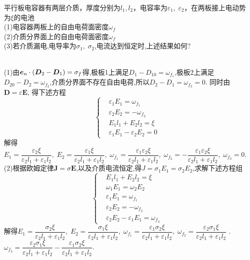 \documentclass{mynote}
\begin{document}
\begin{exercise}{1.11}
    平行板电容器有两层介质，厚度分别为$l_1, l_2$，电容率为$\varepsilon_1,\; \varepsilon_2$，在两板接上电动势为$\xi$的电池 \\
    (1)电容器两板上的自由电荷面密度$\omega_f$\\
    (2)介质分界面上的自由电荷面密度$\omega_f$ \\
    (3)若介质漏电,电导率为$\sigma_1,\; \sigma_2$,电流达到恒定时,上述结果如何?
\end{exercise}
\begin{solution}
    \quad \\
    (1)由$\boldsymbol{e}_n \cdot (\boldsymbol{D}_2 - \boldsymbol{D}_1) = \sigma_f$得,极板1上满足$D_1 - D_{10} = \omega_{f_1}$,极板2上满足$D_{20} - D_2 = \omega_{f_2}$,介质分界面不存在自由电荷,所以$D_2 - D_1 = \omega_{f_3} = 0$. 同时由$\bm{D} = \varepsilon \bm{E}$, 得下述方程
    \[
    \left\{
        \begin{aligned}
            & \varepsilon_1 E_1 = \omega_{f_1} \\
            & \varepsilon_2 E_2 = -\omega_{f_2} \\
            & E_1 l_1 + E_2 l_2 = \xi \\
            &  \varepsilon_1 E_1 - \varepsilon_2 E_2 = 0
        \end{aligned}
    \right.    
    \]
    解得$E_1 = \dfrac{\varepsilon_2 \xi}{\varepsilon_2l_1 + \varepsilon_1l_2}, \; E_2 = \dfrac{\varepsilon_1 \xi}{\varepsilon_2l_1 + \varepsilon_1l_2},\; \omega_{f_1} = \dfrac{\varepsilon_1 \varepsilon_2 \xi}{\varepsilon_2l_1 + \varepsilon_1l_2},\; \omega_{f_2} = -\dfrac{\varepsilon_1 \varepsilon_2 \xi}{\varepsilon_2l_1 + \varepsilon_1l_2},\; \omega_{f_3} = 0$.\\
    (2)根据欧姆定律$\bm{J} = \sigma \bm{E}$,以及介质电流恒定,得$J = \sigma_1 E_1 = \sigma_2 E_2$,求解下述方程组
    \[
    \left\{
        \begin{aligned}
            & E_1 l_1 + E_2 l_2 = \xi \\
            &  \omega_1 E_1 = \omega_2 E_2\\ 
            & \varepsilon_1 E_1 = \omega_{f_1} \\
            & \varepsilon_2 E_2 = -\omega_{f_2} \\
            &  \varepsilon_2 E_2 -  \varepsilon_1 E_1 = \omega_{f_3}
        \end{aligned}
    \right.    
    \]
    解得$E_1 = \dfrac{\sigma_2 \xi}{\varepsilon_2l_1 + \varepsilon_1l_2},\; E_2 = \dfrac{\sigma_1 \xi}{\varepsilon_2l_1 + \varepsilon_1l_2},\; \omega_{f_1} = \dfrac{\varepsilon_1 \sigma_2 \xi}{\varepsilon_2l_1 + \varepsilon_1l_2},\; \omega_{f_2} = \dfrac{\varepsilon_2 \sigma_1 \xi}{\varepsilon_2l_1 + \varepsilon_1l_2}$ .\\
    $\omega_{f_3} = \dfrac{\varepsilon_2 \sigma_1 \xi}{\varepsilon_2l_1 + \varepsilon_1l_2} - \dfrac{\varepsilon_1 \sigma_2 \xi}{\varepsilon_2l_1 + \varepsilon_1l_2}$.
\end{solution}
\end{document}
